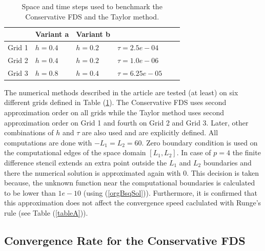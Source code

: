 \documentclass[%
 aip,
cp,  
 amsmath,amssymb,
 reprint,
]{iopconfser}
\newcommand{\rf}[1]{(\ref{#1})}
\begin{document}
\begin{table}[ht]
\centering
\small
		\begin{tabular}{|c|l|l|l|l|l|}
			\hline
                               &           Variant a  &           Variant b     &     \\
			\hline
            Grid 1          &            $h=0.4$  &            $h=0.2$     &    $\tau = 2.5e-04$  \\
			\hline
           Grid 2         &            $h=0.4$  &   $h=0.2$  &    $\tau =1.0e-06$   \\   
   			\hline 
           Grid 3         &            $h=0.8$  &            $h=0.4$  &    $\tau =6.25e-05$   \\    
	   \hline
		\end{tabular}
	\caption{ Space and time steps used to benchmark the Conservative FDS and the Taylor method.}
	\label{gridsT}
\end{table}

The numerical methods described in the article are tested (at least) on six different grids defined in Table \rf{gridsT}. The Conservative FDS uses second approximation order on all grids while the Taylor method uses second approximation order on Grid 1 and fourth on Grid 2 and Grid 3. Later, other combinations of $h$ and $\tau$ are also used and are explicitly defined. All computations are done with $-L_1 = L_2 = 60$.
Zero boundary condition is used on the computational edges of the space domain $[L_1, L_2]$. In case of $p=4$ the finite difference stencil extends an extra point outside the $L_1$ and $L_2$ boundaries and there the numerical solution is approximated again with $0$. This decision is taken because, the unknown function near the computational boundaries is calculated to be lower than $1e-10$ (using \rf{orgBsqSol}). Furthermore, it is confirmed that
this approximation does not affect the convergence speed caclulated with Runge's rule (see Table \rf{tableA}).

\subsection{Convergence Rate for the Conservative FDS}
\end{document}
